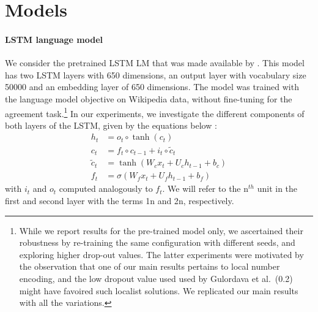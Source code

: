 
\section{Models}


\paragraph{LSTM language model}\label{ssec:lstm_lm}

We consider the pretrained LSTM LM that was made available by \cite{Gulordava:etal:2018}.
This model has two LSTM layers with 650 dimensions, an output layer with vocabulary size 50000 and an embedding layer of 650 dimensions. The model was trained with the language model objective on Wikipedia data, without fine-tuning for the agreement task.\footnote{While we report results for the pre-trained model only, we ascertained their robustness by re-training the same configuration with different seeds, and exploring higher drop-out values. The latter experiments were motivated by the observation that one of our main results pertains to local number encoding, and the low dropout value used used by Gulordava et al.~(0.2) might have favoired such localist solutions. We replicated our main results with all the variations.} In our experiments, we investigate the different components of both layers of the LSTM, given by the equations below \cite{Hochreiter:Schmidhuber:1997}:
\begin{align}
    h_t & = o_t\circ \tanh(c_t)\\ 
     c_t & = f_t\circ c_{t-1} + i_t\circ \widetilde{c}_t\\
     \widetilde{c}_t & = \tanh(W_cx_t + U_ch_{t-1} + b_c)\\
     f_t & = \sigma(W_fx_t + U_fh_{t-1} + b_f) %
\end{align}
\noindent{}with $i_t$ and $o_t$ computed analogously to $f_t$. We will
refer to the n$^{th}$ unit in the first and second layer with the
terms \unit{1}{n} and \unit{2}{n}, respectively.

